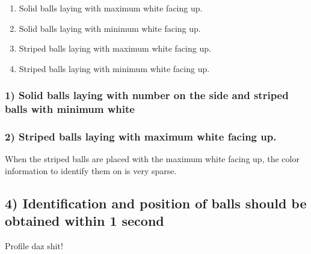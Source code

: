 \begin{enumerate}
\setlength{\itemsep}{0mm}
	\item Solid balls laying with maximum white facing up.\\
	\item Solid balls laying with minimum white facing up.\\
	\item Striped balls laying with maximum white facing up.\\	
	\item Striped balls laying with minimum white facing up.\\	
\end{enumerate}

\subsubsection{1) Solid balls laying with number on the side and striped balls with minimum white}

\subsubsection{2) Striped balls laying with maximum white facing up.}
When the striped balls are placed with the maximum white facing up, the color information to identify them on is very sparse.






\subsection{4) Identification and position of balls should be obtained within 1 second}

Profile daz shit!
